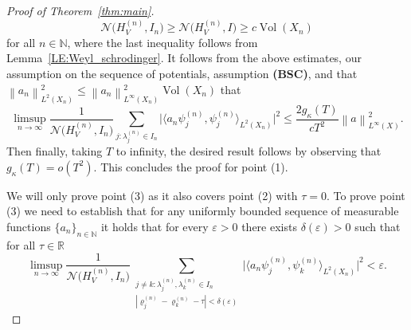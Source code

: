 \documentclass[11pt,twoside,reqno]{amsart}
\newcommand{\R}{\mathbb{R}}
\newcommand{\N}{\mathbb{N}}
\renewcommand{\rho}{\varrho}
\newcommand{\1}{\mathrm{\mathbf{1}}}
\DeclareMathOperator{\Vol}{Vol}
\newcommand{\norm}[1]{\left\lVert#1\right\rVert}
\numberwithin{equation}{section}
\theoremstyle{plain}
\theoremstyle{definition}
\theoremstyle{remark}
\begin{document}
\begin{proof}[Proof of Theorem~\ref{thm:main}]
\begin{equation}
    \mathcal{N}\big(H_V^{(n)},I_n\big)  \geq \mathcal{N}\big(H_V^{(n)},I\big) \geq c\Vol(X_n)
\end{equation}
for all $n\in\N$, where the last inequality follows from Lemma~\ref{LE:Weyl_schrodinger}. It follows from the above estimates, our assumption on the sequence of potentials, assumption \textbf{(BSC)}, and that $\norm{a_n}_{L^2(X_n)}^2 \leq \norm{a_n}_{L^\infty(X_n)}^2\Vol(X_n) $ that
    \begin{equation}
    \limsup_{n\rightarrow \infty}\frac{1}{\mathcal{N}\big(H_V^{(n)},I_n\big)} \sum_{j:\lambda_j^{(n)}\in I_n} \Big| \langle a_n \psi_j^{(n)} , \psi_j^{(n)}\rangle_{L^2(X_n)}  \Big|^2 \leq  \frac{2 g_\kappa(T)}{cT^2} \norm{a}^2_{L^\infty(X)}.
    \end{equation}
Then finally, taking $T$ to infinity, the desired result follows by observing that $g_\kappa(T) = o(T^2)$. This concludes the proof for point (1).

We will only prove point (3) as it also covers point (2) with $\tau=0$. To prove point (3) we need to establish that for any uniformly bounded sequence of measurable functions $\{a_n\}_{n\in\N}$ it holds that for every $\varepsilon>0$ there exists $\delta(\varepsilon)>0$ such that for all $\tau\in\R$
\begin{equation*}
        \limsup_{n\rightarrow \infty}\frac{1}{\mathcal{N}\big(H_V^{(n)},I_n\big)}  \sum_{\substack{j\neq k: \lambda_j^{(n)},\lambda_k^{(n)}\in I_n  \\ |\rho_{j}^{(n)}-\rho_{k}^{(n)}-\tau| < \delta(\varepsilon)}} \Big| \langle a_n \psi_j^{(n)} , \psi_k^{(n)}\rangle_{L^2(X_n)}  \Big|^2 <\varepsilon.
\end{equation*}  


\end{proof}
\end{document}
